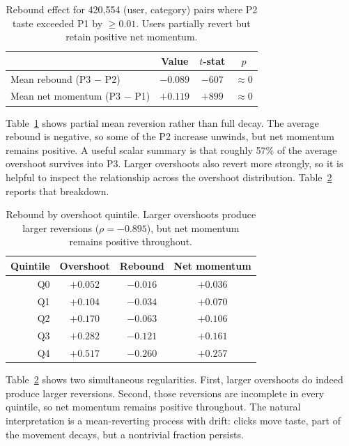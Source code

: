\documentclass[11pt]{article}
\begin{document}
\begin{table}[ht]
\centering
\caption{Rebound effect for 420,554 (user, category) pairs where P2 taste exceeded P1 by $\geq 0.01$. Users partially revert but retain positive net momentum.}
\label{tab:rebound}
\begin{tabular}{lccc}
\toprule
 & Value & $t$-stat & $p$ \\
\midrule
Mean rebound (P3 $-$ P2) & $-0.089$ & $-607$ & $\approx 0$ \\
Mean net momentum (P3 $-$ P1) & $+0.119$ & $+899$ & $\approx 0$ \\
\bottomrule
\end{tabular}
\end{table}
\FloatBarrier

Table~\ref{tab:rebound} shows partial mean reversion rather than full decay. The average rebound is negative, so some of the P2 increase unwinds, but net momentum remains positive. A useful scalar summary is that roughly 57\% of the average overshoot survives into P3. Larger overshoots also revert more strongly, so it is helpful to inspect the relationship across the overshoot distribution. Table~\ref{tab:rebound_quintile} reports that breakdown.

\begin{table}[ht]
\centering
\caption{Rebound by overshoot quintile. Larger overshoots produce larger reversions ($\rho = -0.895$), but net momentum remains positive throughout.}
\label{tab:rebound_quintile}
\begin{tabular}{rccc}
\toprule
Quintile & Overshoot & Rebound & Net momentum \\
\midrule
Q0 & $+0.052$ & $-0.016$ & $+0.036$ \\
Q1 & $+0.104$ & $-0.034$ & $+0.070$ \\
Q2 & $+0.170$ & $-0.063$ & $+0.106$ \\
Q3 & $+0.282$ & $-0.121$ & $+0.161$ \\
Q4 & $+0.517$ & $-0.260$ & $+0.257$ \\
\bottomrule
\end{tabular}
\end{table}
\FloatBarrier

Table~\ref{tab:rebound_quintile} shows two simultaneous regularities. First, larger overshoots do indeed produce larger reversions. Second, those reversions are incomplete in every quintile, so net momentum remains positive throughout. The natural interpretation is a mean-reverting process with drift: clicks move taste, part of the movement decays, but a nontrivial fraction persists.
\end{document}
